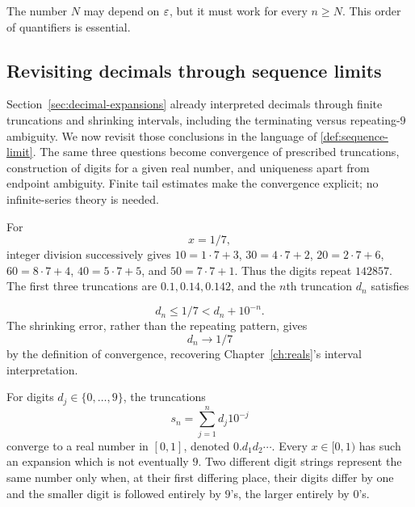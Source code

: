 The number $N$ may depend on $\varepsilon$, but it must work for every $n\geq N$. This order of quantifiers is essential.

\subsection*{Revisiting decimals through sequence limits}
Section~\ref{sec:decimal-expansions} already interpreted decimals through
finite truncations and shrinking intervals, including the terminating
versus repeating-$9$ ambiguity. We now revisit those conclusions in the
language of \cref{def:sequence-limit}. The same three questions become
convergence of prescribed truncations, construction of digits for a given
real number, and uniqueness apart from endpoint ambiguity. Finite tail
estimates make the convergence explicit; no infinite-series theory is needed.
\begin{example}
For
\[
x=1/7,
\]
 integer division successively gives
$10=1\cdot7+3$, $30=4\cdot7+2$, $20=2\cdot7+6$,
$60=8\cdot7+4$, $40=5\cdot7+5$, and $50=7\cdot7+1$.
Thus the digits repeat $142857$. The first three truncations are
$0.1,0.14,0.142$, and the $n$th truncation $d_n$ satisfies

\[
d_n\leq1/7<d_n+10^{-n}.
\]
 The shrinking error, rather than the
repeating pattern, gives
\[
d_n\to1/7
\]
 by the definition of convergence,
recovering Chapter~\ref{ch:reals}'s interval interpretation.
\end{example}
\begin{proposition}
\label{prop:decimal-representations}
For digits $d_j\in\{0,\ldots,9\}$, the truncations
\[
s_n=\sum_{j=1}^n d_j10^{-j}
\]
converge to a real number in $[0,1]$,
denoted $0.d_1d_2\cdots$.
Every $x\in[0,1)$ has such an expansion which is not eventually $9$.
Two different digit strings represent the same number only when, at their
first differing place, their digits differ by one and the smaller digit is
followed entirely by $9$'s, the larger entirely by $0$'s.
\end{proposition}
